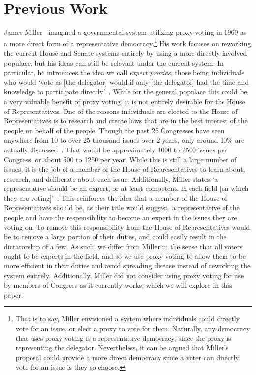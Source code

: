 \section{Previous Work}\label{sec:previous-work}
James Miller~\cite{Miller1969} imagined a governmental system utilizing proxy voting
in 1969 as a more direct form of a representative democracy.\footnote{
    That is to say, Miller envisioned a system where individuals could directly vote
    for an issue, or elect a proxy to vote for them.
    Naturally, any democracy that uses proxy voting is a representative democracy,
    since the proxy is representing the delegator.
    Nevertheless, it can be argued that Miller's proposal could provide a more direct
    democracy since a voter can directly vote for an issue is they so choose.
}
His work focuses on reworking the current House and Senate systems entirely by using a
more-directly involved populace, but his ideas can still be relevant under the current
system.
In particular, he introduces the idea we call \textit{expert proxies},
those being individuals who would `vote as [the delegator] would if only
[the delegator] had the time and knowledge to participate directly'~\cite{Miller1969}.
While for the general populace this could be a very valuable benefit of proxy voting,
it is not entirely desirable for the House of Representatives.
One of the reasons individuals are elected to the House of Representatives is to
research and create laws that are in the best interest of the people on behalf of
the people.
Though the past 25 Congresses have seen anywhere from 10 to over 25 thousand issues
over 2 years, only around 10\% are actually discussed~\cite{GovTrack2022}.
That would be approximately 1000 to 2500 issues per Congress, or about 500 to 1250 per
year.
While this is still a large number of issues, it is the job of a member of the House
of Representatives to learn about, research, and deliberate about each issue.
Additionally, Miller states `a representative should be an expert, or at least
competent, in each field [on which they are voting]'~\cite{Miller1969}.
This reinforces the idea that a member of the House of Representatives should be, as
their title would suggest, a representative of the people and have the responsibility
to become an expert in the issues they are voting on.
To remove this responsibility from the House of Representatives would be to remove
a large portion of their duties, and could easily result in the dictatorship of a few.
As such, we differ from Miller in the sense that all voters ought to be experts in
the field, and so we use proxy voting to allow them to be more efficient in their
duties and avoid spreading disease instead of reworking the system entirely.
Additionally, Miller did not consider using proxy voting for use by members of
Congress as it currently works, which we will explore in this paper.

